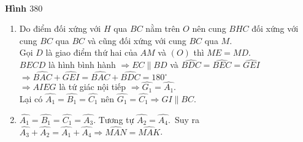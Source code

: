 \begin{bt}
{\begin{center}
\\
			\centering\textbf{Hình $380$}
			\end{center}
			\begin{enumerate}
				\item Do điểm đối xứng với $H$ qua $BC$ nằm trên $O$ nên cung $BHC$ đối xứng với cung $BC$ qua $BC$ và cũng đối xứng với cung $BC$ qua $M$.\\
				Gọi $D$ là giao điểm thứ hai của $AM$ và $(O)$ thì $ME=MD$.\\
				$BECD$ là hình bình hành $\Rightarrow EC\parallel BD$ và $\widehat{BDC}=\widehat{BEC}=\widehat{GEI}$\\
				$\Rightarrow \widehat{BAC}+\widehat{GEI}=\widehat{BAC}+\widehat{BDC}=180^\circ$\\
				$\Rightarrow AIEG$ là tứ giác nội tiếp $\Rightarrow \widehat{G_1}=\widehat{A_1}$.\\
				Lại có $\widehat{A_1}=\widehat{B_1}=\widehat{C_1}$ nên $\widehat{G_1}=\widehat{C_1}\Rightarrow GI\parallel BC$.
				\item $\widehat{A_1}=\widehat{B_1}=\widehat{C_1}=\widehat{A_3}$. Tương tự $\widehat{A_2}=\widehat{A_4}$.\
				Suy ra $\widehat{A_3}+\widehat{A_2}=\widehat{A_1}+\widehat{A_4}\Rightarrow \widehat{MAN}=\widehat{MAK}$.
			\end{enumerate}
			}
\end{bt}
